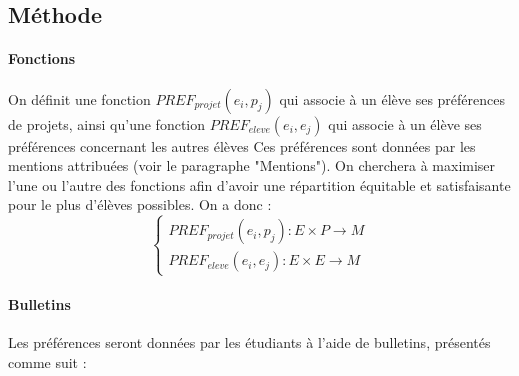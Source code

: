 \documentclass[10pt,a4paper]{scrartcl}
\begin{document}
\subsection{Méthode}
\paragraph{Fonctions}
On définit une fonction $PREF_{projet}(e_{i}, p_{j})$ qui associe à un élève ses préférences de projets, ainsi qu'une fonction $PREF_{eleve}(e_{i}, e_{j})$ qui associe à un élève ses préférences concernant les autres élèves
Ces préférences sont données par les mentions attribuées (voir le paragraphe "Mentions").
On cherchera à maximiser l'une ou l'autre des fonctions afin d'avoir une répartition équitable et satisfaisante pour le plus d'élèves possibles.
On a donc : \\
$$ 
\left\{
	\begin{array}{ll}
		PREF_{projet}(e_{i}, p_{j}) : E \times P \longrightarrow M \\
		PREF_{eleve}(e_{i}, e_{j}) : E \times E \longrightarrow M
	\end{array}
\right.
$$

\newpage
\paragraph{Bulletins}
Les préférences seront données par les étudiants à l'aide de bulletins, présentés comme suit : \\
\end{document}
